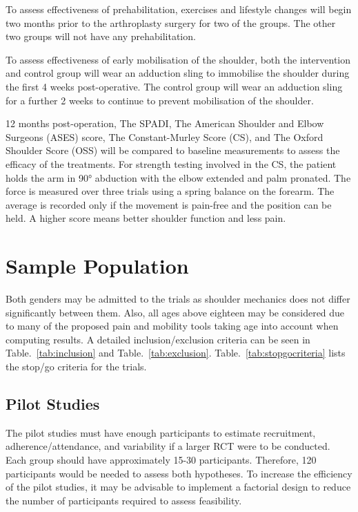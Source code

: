 \documentclass[conference]{IEEEtran}
\begin{document}
To assess effectiveness of prehabilitation, exercises and lifestyle changes will begin two months prior to the arthroplasty surgery for two of the groups. The other two groups will not have any prehabilitation.

To assess effectiveness of early mobilisation of the shoulder, both the intervention and control group will wear an adduction sling to immobilise the shoulder during the first 4 weeks post-operative. The control group will wear an adduction sling for a further 2 weeks to continue to prevent mobilisation of the shoulder.

12 months post-operation, The SPADI, The American Shoulder and Elbow Surgeons (ASES) score, The Constant-Murley Score (CS), and The Oxford Shoulder Score (OSS) will be compared to baseline measurements to assess the efficacy of the treatments. For strength testing involved in the CS, the patient holds the arm in 90° abduction with the elbow extended and palm pronated. The force is measured over three trials using a spring balance on the forearm. The average is recorded only if the movement is pain-free and the position can be held. A higher score means better shoulder function and less pain.
\section{Sample Population}

Both genders may be admitted to the trials as shoulder mechanics does not differ significantly between them. Also, all ages above eighteen may be considered due to many of the proposed pain and mobility tools taking age into account when computing results. A detailed inclusion/exclusion criteria can be seen in Table.~\ref{tab:inclusion} and Table.~\ref{tab:exclusion}. Table.~\ref{tab:stopgocriteria} lists the stop/go criteria for the trials.

\subsection{Pilot Studies}

The pilot studies must have enough participants to estimate recruitment, adherence/attendance, and variability if a larger RCT were to be conducted. Each group should have approximately 15-30 participants. Therefore, 120 participants would be needed to assess both hypotheses. To increase the efficiency of the pilot studies, it may be advisable to implement a factorial design to reduce the number of participants required to assess feasibility.
\end{document}
